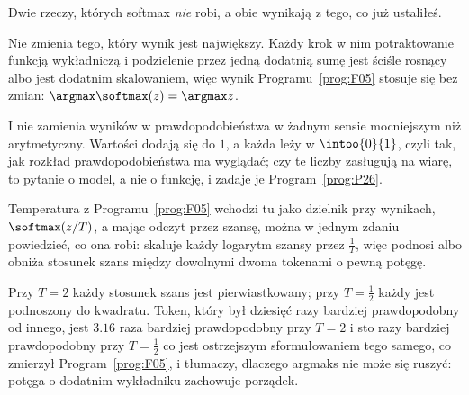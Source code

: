 \begin{fr}
Dwie rzeczy, których softmax \emph{nie} robi, a obie wynikają z tego, co już
ustaliłeś.

Nie zmienia tego, który wynik jest największy. Każdy krok w nim \dash{}
potraktowanie funkcją wykładniczą i podzielenie przez jedną dodatnią sumę
\dash{} jest ściśle rosnący albo jest dodatnim skalowaniem, więc wynik
Programu~\ref{prog:F05} stosuje się bez zmian:
$\argmax \softmax(z) = \argmax z$.

I nie zamienia wyników w prawdopodobieństwa w żadnym sensie mocniejszym niż
arytmetyczny. Wartości dodają się do $1$, a każda leży w $\intoo{0}{1}$, czyli
tak, jak rozkład prawdopodobieństwa ma wyglądać; czy te liczby zasługują na
wiarę, to pytanie o model, a nie o funkcję, i zadaje je
Program~\ref{prog:P26}.

\begin{aibox}
Temperatura z Programu~\ref{prog:F05} wchodzi tu jako dzielnik przy wynikach,
$\softmax(z/T)$, a mając odczyt przez szansę, można w jednym zdaniu powiedzieć,
co ona robi: skaluje każdy logarytm szansy przez $\frac{1}{T}$, więc podnosi
albo obniża stosunek szans między dowolnymi dwoma tokenami o pewną potęgę.

Przy $T = 2$ każdy stosunek szans jest pierwiastkowany; przy
$T = \frac{1}{2}$ każdy jest podnoszony do kwadratu. Token, który był
dziesięć razy bardziej prawdopodobny od innego, jest $\num{3.16}$ raza
bardziej prawdopodobny przy $T = 2$ i sto razy bardziej prawdopodobny przy
$T = \frac{1}{2}$ \dash{} co jest ostrzejszym sformułowaniem tego samego, co
zmierzył Program~\ref{prog:F05}, i tłumaczy, dlaczego argmaks nie może się
ruszyć: potęga o dodatnim wykładniku zachowuje porządek.
\end{aibox}
\end{fr}

